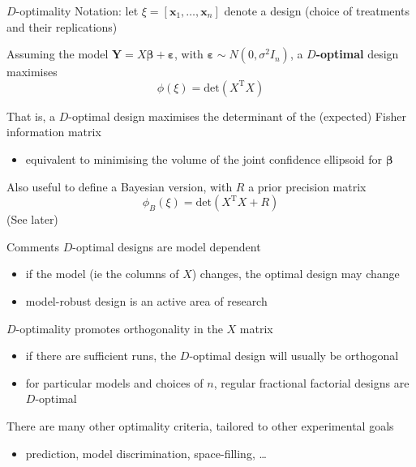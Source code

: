 \documentclass[
  ignorenonframetext,
]{beamer}
\providecommand{\tightlist}{%
  \setlength{\itemsep}{0pt}\setlength{\parskip}{0pt}}
\begin{document}
\begin{frame}{\(D\)-optimality}
\protect\hypertarget{d-optimality}{}
Notation: let \(\xi = [\boldsymbol{x}_1,\ldots,\boldsymbol{x}_n]\)
denote a design (choice of treatments and their replications)

Assuming the model
\(\boldsymbol{Y}= X\boldsymbol{\beta}+ \boldsymbol{\varepsilon}\), with
\(\boldsymbol{\varepsilon}\sim N(0, \sigma^2I_n)\), a
\textbf{\(D\)-optimal} design maximises \[
\phi(\xi) = \mathrm{det}\left(X^\mathrm{T}X\right)
\]

That is, a \(D\)-optimal design maximises the determinant of the
(expected) Fisher information matrix

\begin{itemize}
\tightlist
\item
  equivalent to minimising the volume of the joint confidence ellipsoid
  for \(\boldsymbol{\beta}\)
\end{itemize}

Also useful to define a Bayesian version, with \(R\) a prior precision
matrix \[
\phi_B(\xi) = \mathrm{det}\left(X^\mathrm{T}X + R\right)
\] (See later)
\end{frame}

\begin{frame}{Comments}
\protect\hypertarget{comments}{}
\(D\)-optimal designs are model dependent

\begin{itemize}
\tightlist
\item
  if the model (ie the columns of \(X\)) changes, the optimal design may
  change
\item
  model-robust design is an active area of research
\end{itemize}

\(D\)-optimality promotes orthogonality in the \(X\) matrix

\begin{itemize}
\tightlist
\item
  if there are sufficient runs, the \(D\)-optimal design will usually be
  orthogonal
\item
  for particular models and choices of \(n\), regular fractional
  factorial designs are \(D\)-optimal
\end{itemize}

There are many other optimality criteria, tailored to other experimental
goals

\begin{itemize}
\tightlist
\item
  prediction, model discrimination, space-filling, \ldots{}
\end{itemize}
\end{frame}
\end{document}
